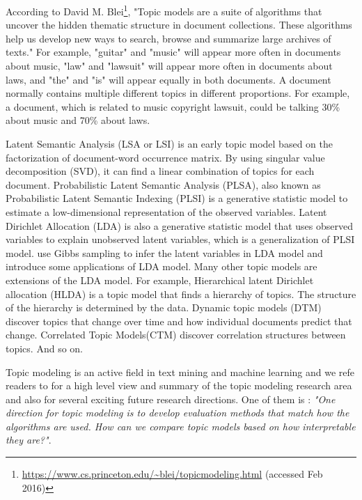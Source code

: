 According to David M. Blei\footnote{\url{https://www.cs.princeton.edu/~blei/topicmodeling.html} (accessed Feb 2016)}, "Topic models are a suite of algorithms that uncover the hidden thematic structure in document collections. These algorithms help us develop new ways to search, browse and summarize large archives of texts." For example, "guitar" and "music" will appear more often in documents about music, "law" and "lawsuit" will appear more often in documents about laws, and "the" and "is" will appear equally in both documents. A document normally contains multiple different topics in different proportions. For example, a document, which is related to music copyright lawsuit, could be talking 30\% about music and 70\% about laws.

Latent Semantic Analysis (LSA or LSI)\cite{chp2deerwester1990indexing} \cite{chp2landauer1997solution} is an early topic model based on the factorization of document-word occurrence matrix. By using singular value decomposition (SVD), it can find a linear combination of topics for each document.
Probabilistic Latent Semantic Analysis (PLSA), also known as Probabilistic Latent Semantic Indexing (PLSI)\cite{chp2papadimitriou1998latent} \cite{chp2hofmann1999probabilistic} is a generative statistic model to estimate a low-dimensional representation of the observed variables. Latent Dirichlet Allocation (LDA)\cite{blei2003latent} is also a generative statistic model that uses observed variables to explain unobserved latent variables, which is a generalization of PLSI model. \cite{griffiths2004finding} \cite{chp2griffiths2002probabilistic} use Gibbs sampling to infer the latent variables in LDA model and introduce some applications of LDA model. Many other topic models are extensions of the LDA model. For example, Hierarchical latent Dirichlet allocation (HLDA)\cite{chp2DBLP:conf/nips/2003} is a topic model that finds a hierarchy of topics. The structure of the hierarchy is determined by the data. Dynamic topic models (DTM)\cite{chp2blei2006dynamic} discover topics that change over time and how individual documents predict that change. Correlated Topic Models(CTM)\cite{chp2blei2006correlated} discover correlation structures between topics. And so on.

Topic modeling is an active field in text mining and machine learning and we refe readers to \cite{chp2Blei:2012:PTM:2133806.2133826} for a high level view and summary of the topic modeling research area and also for several exciting future research directions. One of them is : \textit{"One direction for topic modeling is to develop evaluation methods that match how the algorithms are used. How can we compare topic models based on how interpretable they are?"}.

